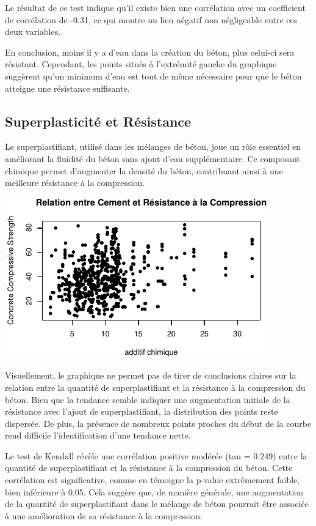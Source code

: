 \documentclass[
  12pt,
]{article}
\begin{document}
Le résultat de ce test indique qu'il existe bien une corrélation avec un
coefficient de corrélation de -0.31, ce qui montre un lien négatif non
négligeable entre ces deux variables.

En conclusion, moins il y a d'eau dans la création du béton, plus
celui-ci sera résistant. Cependant, les points situés à l'extrémité
gauche du graphique suggèrent qu'un minimum d'eau est tout de même
nécessaire pour que le béton atteigne une résistance suffisante.

\subsection{Superplasticité et
Résistance}\label{superplasticituxe9-et-ruxe9sistance}

Le superplastifiant, utilisé dans les mélanges de béton, joue un rôle
essentiel en améliorant la fluidité du béton sans ajout d'eau
supplémentaire. Ce composant chimique permet d'augmenter la densité du
béton, contribuant ainsi à une meilleure résistance à la compression.

\begin{center}\includegraphics{rmd_final_files/figure-latex/unnamed-chunk-19-1} \end{center}

Visuellement, le graphique ne permet pas de tirer de conclusions claires
sur la relation entre la quantité de superplastifiant et la résistance à
la compression du béton. Bien que la tendance semble indiquer une
augmentation initiale de la résistance avec l'ajout de superplastifiant,
la distribution des points reste dispersée. De plus, la présence de
nombreux points proches du début de la courbe rend difficile
l'identification d'une tendance nette.

Le test de Kendall révèle une corrélation positive modérée (tau = 0.249)
entre la quantité de superplastifiant et la résistance à la compression
du béton. Cette corrélation est significative, comme en témoigne la
p-value extrêmement faible, bien inférieure à 0.05. Cela suggère que, de
manière générale, une augmentation de la quantité de superplastifiant
dans le mélange de béton pourrait être associée à une amélioration de sa
résistance à la compression.
\end{document}
